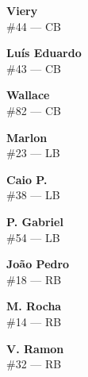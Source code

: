 \documentclass[11pt]{article}
\begin{document}
\begin{minipage}[t]{0.30\textwidth}
\centering
\textbf{Viery}\\
\#44 --- CB\\
\vspace{0.2cm}
\end{minipage}
\hfill
\begin{minipage}[t]{0.30\textwidth}
\centering
\textbf{Luís Eduardo}\\
\#43 --- CB\\
\vspace{0.2cm}
\end{minipage}
\hfill
\begin{minipage}[t]{0.30\textwidth}
\centering
\textbf{Wallace}\\
\#82 --- CB\\
\vspace{0.2cm}
\end{minipage}
\vspace{0.5cm}

\begin{minipage}[t]{0.30\textwidth}
\centering
\textbf{Marlon}\\
\#23 --- LB\\
\vspace{0.2cm}
\end{minipage}
\hfill
\begin{minipage}[t]{0.30\textwidth}
\centering
\textbf{Caio P.}\\
\#38 --- LB\\
\vspace{0.2cm}
\end{minipage}
\hfill
\begin{minipage}[t]{0.30\textwidth}
\centering
\textbf{P. Gabriel}\\
\#54 --- LB\\
\vspace{0.2cm}
\end{minipage}
\vspace{0.5cm}

\begin{minipage}[t]{0.30\textwidth}
\centering
\textbf{João Pedro}\\
\#18 --- RB\\
\vspace{0.2cm}
\end{minipage}
\hfill
\begin{minipage}[t]{0.30\textwidth}
\centering
\textbf{M. Rocha}\\
\#14 --- RB\\
\vspace{0.2cm}
\end{minipage}
\hfill
\begin{minipage}[t]{0.30\textwidth}
\centering
\textbf{V. Ramon}\\
\#32 --- RB\\
\vspace{0.2cm}
\end{minipage}
\vspace{0.5cm}
\end{document}
